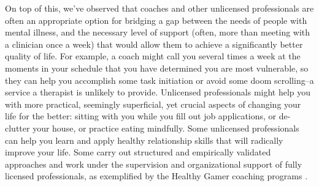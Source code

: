 \documentclass[12pt,letterpaper]{book}
\begin{document}
On top of this, we've observed that coaches and other unlicensed professionals are often an appropriate option for bridging a gap between the needs of people with mental illness, and the necessary level of support (often, more than meeting with a clinician once a week) that would allow them to achieve a significantly better quality of life.  For example, a coach might call you several times a week at the moments in your schedule that you have determined you are most vulnerable, so they can help you accomplish some task initiation or avoid some doom scrolling--a service a therapist is unlikely to provide. Unlicensed professionals might help you with more practical, seemingly superficial, yet crucial aspects of changing your life for the better: sitting with you while you fill out job applications, or de-clutter your house, or practice eating mindfully. Some unlicensed professionals can help you learn and apply healthy relationship skills that will radically improve your life. Some carry out structured and empirically validated approaches and work under the supervision and organizational support of fully licensed professionals, as exemplified by the Healthy Gamer coaching programs \cite{healthyGamerMethodology}.
\end{document}
